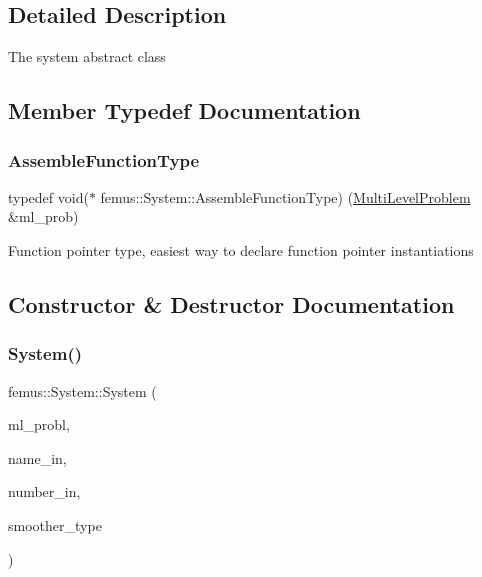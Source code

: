 \subsection{Detailed Description}
The system abstract class 

\subsection{Member Typedef Documentation}
\mbox{\label{classfemus_1_1_system_ae71fa78abbc4b3efe8ef1dc057275b9b}} 
\subsubsection{\texorpdfstring{Assemble\+Function\+Type}{AssembleFunctionType}}
{\footnotesize\ttfamily typedef void($\ast$  femus\+::\+System\+::\+Assemble\+Function\+Type) (\mbox{\hyperlink{classfemus_1_1_multi_level_problem}{Multi\+Level\+Problem}} \&ml\+\_\+prob)\hspace{0.3cm}{\ttfamily [protected]}}

Function pointer type, easiest way to declare function pointer instantiations 

\subsection{Constructor \& Destructor Documentation}
\mbox{\label{classfemus_1_1_system_ae4a9d3c1f17c10f42aa0935499a080cf}} 
\subsubsection{\texorpdfstring{System()}{System()}}
{\footnotesize\ttfamily femus\+::\+System\+::\+System (\begin{DoxyParamCaption}\item[{\mbox{\hyperlink{classfemus_1_1_multi_level_problem}{Multi\+Level\+Problem}} \&}]{ml\+\_\+probl,  }\item[{const std\+::string \&}]{name\+\_\+in,  }\item[{const unsigned int}]{number\+\_\+in,  }\item[{const \mbox{\hyperlink{_mg_smoother_enum_8hpp_a4d11c2ff93e2f0f440c879a9c40cda71}{Mg\+Smoother}} \&}]{smoother\+\_\+type }\end{DoxyParamCaption})}

